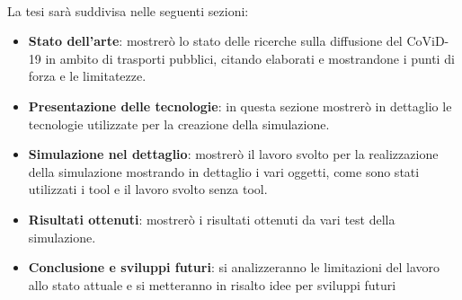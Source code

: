 \documentclass[12pt]{book}
\begin{document}
		\\
		La tesi sarà suddivisa nelle seguenti sezioni:
		\begin{itemize}
			\item \textbf{Stato dell'arte}: mostrerò lo stato delle ricerche sulla diffusione del CoViD-19 in ambito di trasporti pubblici, citando elaborati e mostrandone i punti di forza e le limitatezze.
			\item \textbf{Presentazione delle tecnologie}: in questa sezione mostrerò in dettaglio le tecnologie utilizzate per la creazione della simulazione.
			\item\textbf{Simulazione nel dettaglio}: mostrerò il lavoro svolto per la realizzazione della simulazione mostrando in dettaglio i vari oggetti, come sono stati utilizzati i tool e il lavoro svolto senza tool.
			\item\textbf{Risultati ottenuti}: mostrerò i risultati ottenuti da vari test della simulazione.
			\item\textbf{Conclusione e sviluppi futuri}: si analizzeranno le limitazioni del lavoro allo stato attuale e si metteranno in risalto idee per sviluppi futuri
		\end{itemize}
\end{document}
